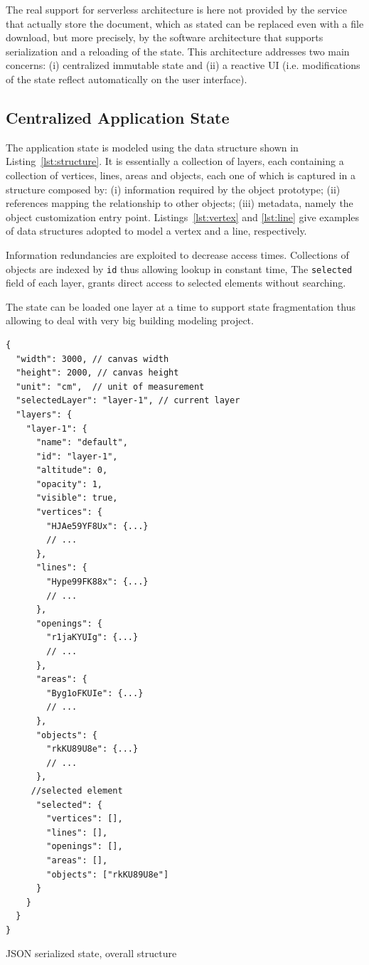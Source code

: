 The real support for serverless architecture is here not provided by the service that actually store the document, which as stated can be replaced even with a file download, but more precisely, by the software architecture that supports serialization and a reloading of the state. This architecture addresses two main concerns: (i) centralized immutable state and (ii) a reactive UI (i.e. modifications of the state reflect automatically on the user interface).

\subsection{Centralized Application State}\label{ssub:centr_state}

The application state is modeled using the data structure shown in Listing~\ref{lst:structure}. It is essentially a collection of layers, each containing a collection of vertices, lines, areas and objects, each one of which is captured in a structure composed by: (i) information required by the object prototype; (ii) references mapping the relationship to other objects; (iii) metadata, namely the object customization entry point. Listings~\ref{lst:vertex} and \ref{lst:line} give examples of data structures adopted to model a vertex and a line, respectively. 

Information redundancies are exploited to decrease access times. Collections of objects are indexed by \texttt{id} thus allowing lookup in constant time, The \texttt{selected} field of each layer, grants direct access to selected elements without searching.

The state can be loaded one layer at a time to support state fragmentation thus allowing to deal with very big building modeling project.

\begin{listing}
\begin{verbatim}
{
  "width": 3000, // canvas width
  "height": 2000, // canvas height
  "unit": "cm",  // unit of measurement
  "selectedLayer": "layer-1", // current layer
  "layers": {
    "layer-1": {
      "name": "default",
      "id": "layer-1",
      "altitude": 0,
      "opacity": 1,
      "visible": true,
      "vertices": {
        "HJAe59YF8Ux": {...}
        // ...
      },
      "lines": {
        "Hype99FK88x": {...}
        // ...
      },
      "openings": {
        "r1jaKYUIg": {...}
        // ...
      },
      "areas": {
        "Byg1oFKUIe": {...}
        // ...
      },
      "objects": {
        "rkKU89U8e": {...}
        // ...
      },
     //selected element
      "selected": {
        "vertices": [],
        "lines": [],
        "openings": [],
        "areas": [],
        "objects": ["rkKU89U8e"]
      }
    }
  }
}
\end{verbatim}
\caption{JSON serialized state, overall structure} 
\label{lst:structure}
\end{listing}

